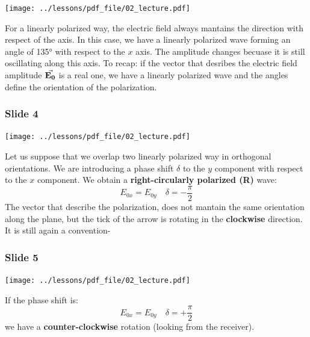 \documentclass[../main/main.tex]{subfiles}
\begin{document}
\begin{minipage}[]{0.5\linewidth}
\centering
\texttt{[image: ../lessons/pdf\_file/02\_lecture.pdf]}
\end{minipage}
\hspace{0.3cm}\vspace{0.3cm}
\begin{minipage}[c]{0.47\linewidth}
For a linearly polarized way, the electric field always mantains the direction with respect of the axis. In this case, we have a linearly polarized wave forming an angle of 135° with respect to the \( x \) axis. The amplitude changes becuase it is still oscillating along this axis. To recap: if the vector that desribes the electric field amplitude \( \va{E_0} \) is a real one, we have a linearly polarized wave and the angles define the orientation of the polarization.
\end{minipage}

\newpage

\subsubsection*{Slide 4}

\begin{minipage}[]{0.5\linewidth}
\centering
\texttt{[image: ../lessons/pdf\_file/02\_lecture.pdf]}
\end{minipage}
\hspace{0.3cm}\vspace{0.3cm}
\begin{minipage}[c]{0.47\linewidth}
Let us suppose that we overlap two linearly polarized way in orthogonal orientations. We are introducing a phase shift \( \delta  \) to the \( y \) component with respect to the \( x \) component. We obtain a \textbf{right-circularly polarized (R)} wave:
\begin{equation*}
  E_{0x} = E_{0y} \quad \delta = -\frac{\pi }{2}
\end{equation*}
The vector that describe the polarization, does not mantain the same orientation along the plane, but the tick of the arrow is rotating in the \textbf{clockwise} direction.
It is still again a convention-
\end{minipage}

\subsubsection*{Slide 5}

\begin{minipage}[]{0.5\linewidth}
\centering
\texttt{[image: ../lessons/pdf\_file/02\_lecture.pdf]}
\end{minipage}
\hspace{0.3cm}\vspace{0.3cm}
\begin{minipage}[c]{0.47\linewidth}
If the phase shift is:
\begin{equation*}
  E_{0x} = E_{0y} \quad \delta = +\frac{\pi }{2}
\end{equation*}
we have a \textbf{counter-clockwise} rotation (looking from the receiver).
\end{minipage}
\end{document}
